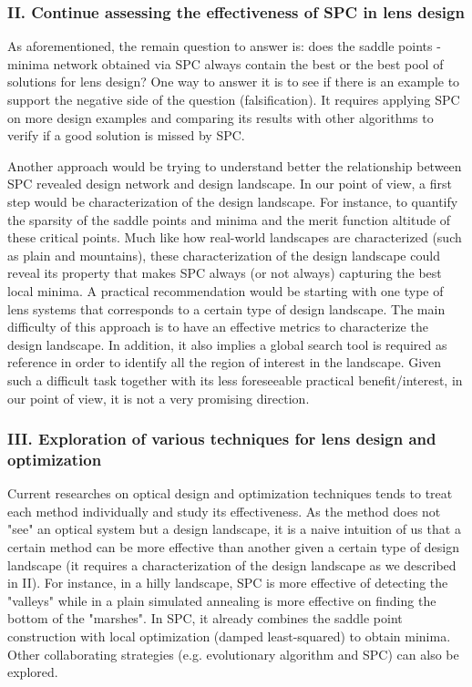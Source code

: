 \subsubsection{II. Continue assessing the effectiveness of SPC in lens design}

As aforementioned, the remain question to answer is: does the saddle points - minima network obtained via SPC always contain the best or the best pool of solutions for lens design? One way to answer it is to see if there is an example to support the negative side of the question (falsification). It requires applying SPC on more design examples and comparing its results with other algorithms to verify if a good solution is missed by SPC. 

Another approach would be trying to understand better the relationship between SPC revealed design network and design landscape. In our point of view, a first step would be characterization of the design landscape. For instance, to quantify the sparsity of the saddle points and minima and the merit function altitude of these critical points. Much like how real-world landscapes are characterized (such as plain and mountains), these characterization of the design landscape could reveal its property that makes SPC always (or not always) capturing the best local minima. A practical recommendation would be starting with one type of lens systems that corresponds to a certain type of design landscape. The main difficulty of this approach is to have an effective metrics to characterize the design landscape. In addition, it also implies a global search tool is required as reference in order to identify all the region of interest in the landscape. Given such a difficult task together with its less foreseeable practical benefit/interest, in our point of view, it is not a very promising direction. 

\subsubsection{III. Exploration of various techniques for lens design and optimization}

Current researches on optical design and optimization techniques tends to treat each method individually and study its effectiveness. As the method does not "see" an optical system but a design landscape, it is a naive intuition of us that a certain method can be more effective than another given a certain type of design landscape (it requires a characterization of the design landscape as we described in II). For instance, in a hilly landscape, SPC is more effective of detecting the "valleys" while in a plain simulated annealing is more effective on finding the bottom of the "marshes". In SPC, it already combines the saddle point construction with local optimization (damped least-squared) to obtain minima. Other collaborating strategies (e.g. evolutionary algorithm and SPC) can also be explored.

